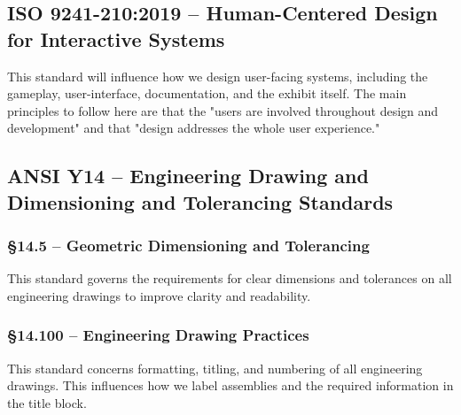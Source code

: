 \documentclass[11pt]{article} %
\begin{document}
\subsection{ISO 9241-210:2019 -- Human-Centered Design for Interactive Systems}
This standard will influence how we design user-facing systems, including the gameplay, user-interface, documentation, and the exhibit itself. The main principles to follow here are that the "users are involved throughout design and development" and that "design addresses the whole user experience."

\subsection{ANSI Y14 -- Engineering Drawing and Dimensioning and Tolerancing Standards}

\subsubsection*{\S 14.5 -- Geometric Dimensioning and Tolerancing}
This standard governs the requirements for clear dimensions and tolerances on all engineering drawings to improve clarity and readability. 

\subsubsection*{\S 14.100 -- Engineering Drawing Practices}
This standard concerns formatting, titling, and numbering of all engineering drawings. This influences how we label assemblies and the required information in the title block. 
\end{document}
